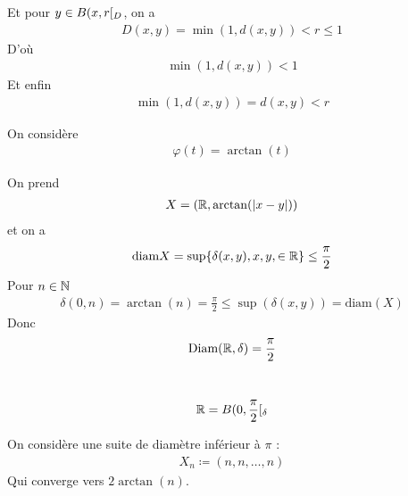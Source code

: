 \documentclass[french,a4paper,10pt]{article}
\begin{document}
\begin{td-sol}
\begin{enumerate}
				Et pour $y\in B({x,r}\mathopen{}[\mathclose{}_D$, on a
					\[\begin{gathered}
						D(x,y)=\min(1,d(x,y))<r\le 1
					\end{gathered}\]
				D'où
					\[\begin{aligned}
						\min(1,d(x,y))<1
					\end{aligned}\]
				Et enfin
					\[\begin{aligned}
						\min(1,d(x,y))=d(x,y)<r
					\end{aligned}\]
		\end{enumerate}
	\end{td-sol}
	\begin{td-exo}
		On considère 
			\[\begin{aligned}
				\varphi(t)=\arctan(t)
			\end{aligned}\]
	\end{td-exo}

	\begin{td-sol}
		On prend 
			\[\begin{gathered}
				X=\left(\mathbb{R},\arctan(|x-y|)\right)
			\end{gathered}\]
		et on a
			\[\begin{gathered}
				\text{diam} X=\sup\{\delta(x,y),x,y,\in\mathbb{R}\}\le\frac\pi2
			\end{gathered}\]
		Pour $n\in\mathbb{N}$
			\[\begin{gathered}
				\delta(0,n)=\arctan(n)=\frac\pi2\le\sup(\delta(x,y))=\text{diam}(X)
			\end{gathered}\]
		Donc
			\[\begin{aligned}
				\text{Diam}(\mathbb{R},\delta)=\frac\pi2
			\end{aligned}\]
		\begin{no-num-remark}\,
			\[\begin{aligned}
				\mathbb{R}=B({0,\frac\pi2}\mathopen{}[\mathclose{}_\delta
			\end{aligned}\]
			
		\end{no-num-remark}
		On considère une suite de diamètre inférieur à $\pi$ : 
			\[\begin{aligned}
				X_n\coloneq (n,n,\dots,n)
			\end{aligned}\]
		Qui converge vers $2\arctan(n)$.
	\end{td-sol}
\end{document}
